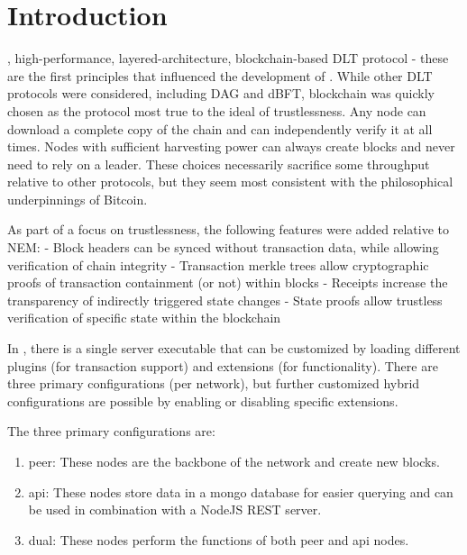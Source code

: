 \section{Introduction}
\label{sec:introduction}


, high-performance, layered-architecture, blockchain-based DLT protocol - these are the first principles that influenced the development of \codename.
While other DLT protocols were considered, including DAG and dBFT, blockchain was quickly chosen as the protocol most true to the ideal of trustlessness.
Any node can download a complete copy of the chain and can independently verify it at all times.
Nodes with sufficient harvesting power can always create blocks and never need to rely on a leader.
These choices necessarily sacrifice some throughput relative to other protocols, but they seem most consistent with the philosophical underpinnings of Bitcoin.

As part of a focus on trustlessness, the following features were added relative to NEM:
- Block headers can be synced without transaction data, while allowing verification of chain integrity
- Transaction merkle trees allow cryptographic proofs of transaction containment (or not) within blocks
- Receipts increase the transparency of indirectly triggered state changes
- State proofs allow trustless verification of specific state within the blockchain

In \codename, there is a single server executable that can be customized by loading different plugins (for transaction support) and extensions (for functionality).
There are three primary configurations (per network), but further customized hybrid configurations are possible by enabling or disabling specific extensions.

The three primary configurations are:
\begin{enumerate}
\item peer: These nodes are the backbone of the network and create new blocks.
\item api: These nodes store data in a mongo database for easier querying and can be used in combination with a NodeJS REST server.
\item dual: These nodes perform the functions of both peer and api nodes.
\end{enumerate}

